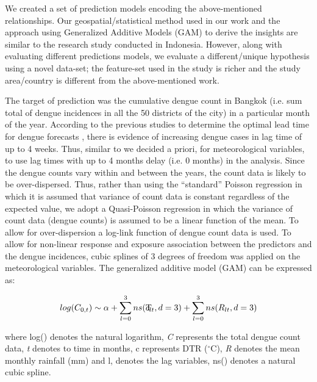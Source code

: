 \documentclass{bmcart}
\begin{document}
We created a set of prediction models encoding the above-mentioned relationships. Our geospatial/statistical method used in our work and the approach using Generalized Additive Models (GAM) to derive the insights are similar to the research study \cite{ramadona2016prediction} conducted in Indonesia. However, along with evaluating different predictions models, we evaluate a different/unique hypothesis using a novel data-set; the feature-set used in the study is richer and the study area/country is different from the above-mentioned work. 

The target of prediction was the  cumulative dengue count in Bangkok (i.e. sum total of dengue incidences in all the 50 districts of the city) in a particular month of the year. According to the previous studies to determine the optimal lead time for dengue forecasts \cite{hii2012optimal}, there is evidence of increasing dengue cases in lag time of up to 4 weeks. Thus, similar to \cite{ramadona2016prediction} we decided a priori, for meteorological variables, to use lag times with up to 4 months delay (i.e. 0 months) in the analysis.  Since the dengue counts vary within and between the years, the count data is likely to be over-dispersed. Thus, rather than using the ``standard'' Poisson regression in which it is assumed that variance of count data is constant regardless of the expected value, we adopt a Quasi-Poisson regression in which the variance of count data (dengue counts) is assumed to be a linear function of the mean. To allow for over-dispersion a log-link function of dengue count data is used. To allow for non-linear response and exposure association between the predictors and the dengue incidences, cubic splines of 3 degrees of freedom was applied on the meteorological variables. The generalized additive model (GAM) can be expressed as:


\begin{equation}
\begin{aligned}
\label{eq:meteorological}
log (C_{0,t}) \sim \alpha +  \sum_{l=0}^{3} ns(\rlap{T}c _ {lt}, d =3) + \sum_{l=0}^{3} ns(R_ {lt}, d =3)
\end{aligned}
\end{equation}


where log() denotes the natural logarithm, \textit{C} represents the total dengue count data, \textit{t} denotes to time in months, c represents DTR ($^{\circ}$C), \textit{R} denotes the mean monthly rainfall (mm) and  l, denotes the lag variables, ns() denotes a natural cubic spline. \\
\end{document}
